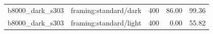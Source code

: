 \begin{longtable}{l>{\raggedright\arraybackslash}p{.42\linewidth}rrr}
b8000\_\allowbreak{}dark\_\allowbreak{}s303 & %
framing:standard/dark & %
400 & %
86.00 & %
99.36 \\ %

b8000\_\allowbreak{}dark\_\allowbreak{}s303 & %
framing:standard/light & %
400 & %
0.00 & %
55.82 \\ %


\end{longtable}
